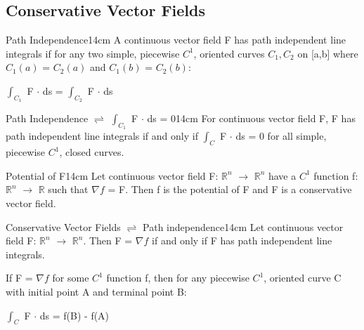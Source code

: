     \vspace{0.5cm}





\subsection{ Conservative Vector Fields }

    \begin{definition}{Path Independence}{14cm}
        A continuous vector field F has {\color{lblue} path independent}
        line integrals if for any two simple, piecewise $C^1$, oriented curves
        $C_1,C_2$ on [a,b] where $C_1(a)$ = $C_2(a)$
        and $C_1(b)$ = $C_2(b)$:

        \hspace{0.5cm}
        $\int_{C_1}$ F $\cdot$ ds = $\int_{C_2}$ F $\cdot$ ds
    \end{definition}

    \vspace{0.5cm}



    \begin{wtheorem}{Path Independence $\rightleftharpoons$
    $\int_{C_1}$ F $\cdot$ ds = 0}{14cm}
        For continuous vector field F, F has path independent line integrals
        if and only if $\int_{C}$ F $\cdot$ ds = 0
        for all simple, piecewise $C^1$, closed curves.
    \end{wtheorem}

    \vspace{0.5cm}



    \begin{definition}{Potential of F}{14cm}
        Let continuous vector field F: $\mathbb{R}^n$ $\rightarrow$ $\mathbb{R}^n$
        have a $C^1$ function f: $\mathbb{R}^n$ $\rightarrow$ $\mathbb{R}$
        such that $\nabla f$ = F.
        Then f is the {\color{lblue} potential} of F
        and F is a {\color{lblue} conservative vector field}.
    \end{definition}

    \vspace{0.5cm}



    \begin{wtheorem}{Conservative Vector Fields $\rightleftharpoons$
    Path independence}{14cm}
        Let continuous vector field F: $\mathbb{R}^n$ $\rightarrow$ $\mathbb{R}^n$.
        Then F = $\nabla f$ if and only if F has path independent
        line integrals.

        If F = $\nabla f$ for some $C^1$ function f, then
        for any piecewise $C^1$, oriented curve C with initial point A and
        terminal point B:

        \hspace{0.5cm}
        $\int_C$ F $\cdot$ ds
        = f(B) - f(A)
    \end{wtheorem}




